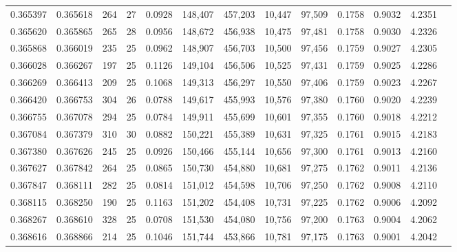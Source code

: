 \begin{tabular}{rrrrrrrrrrrrr}
0.365397 & 0.365618 & 264 &  27 &                                     0.0928 & 148,407 & 457,203 &  10,447 &  97,509 & 0.1758 & 0.9032 & 4.2351 \\
0.365620 & 0.365865 & 265 &  28 &                                     0.0956 & 148,672 & 456,938 &  10,475 &  97,481 & 0.1758 & 0.9030 & 4.2326 \\
0.365868 & 0.366019 & 235 &  25 &                                     0.0962 & 148,907 & 456,703 &  10,500 &  97,456 & 0.1759 & 0.9027 & 4.2305 \\
0.366028 & 0.366267 & 197 &  25 &                                     0.1126 & 149,104 & 456,506 &  10,525 &  97,431 & 0.1759 & 0.9025 & 4.2286 \\
0.366269 & 0.366413 & 209 &  25 &                                     0.1068 & 149,313 & 456,297 &  10,550 &  97,406 & 0.1759 & 0.9023 & 4.2267 \\
0.366420 & 0.366753 & 304 &  26 &                                     0.0788 & 149,617 & 455,993 &  10,576 &  97,380 & 0.1760 & 0.9020 & 4.2239 \\
0.366755 & 0.367078 & 294 &  25 &                                     0.0784 & 149,911 & 455,699 &  10,601 &  97,355 & 0.1760 & 0.9018 & 4.2212 \\
0.367084 & 0.367379 & 310 &  30 &                                     0.0882 & 150,221 & 455,389 &  10,631 &  97,325 & 0.1761 & 0.9015 & 4.2183 \\
0.367380 & 0.367626 & 245 &  25 &                                     0.0926 & 150,466 & 455,144 &  10,656 &  97,300 & 0.1761 & 0.9013 & 4.2160 \\
0.367627 & 0.367842 & 264 &  25 &                                     0.0865 & 150,730 & 454,880 &  10,681 &  97,275 & 0.1762 & 0.9011 & 4.2136 \\
0.367847 & 0.368111 & 282 &  25 &                                     0.0814 & 151,012 & 454,598 &  10,706 &  97,250 & 0.1762 & 0.9008 & 4.2110 \\
0.368115 & 0.368250 & 190 &  25 &                                     0.1163 & 151,202 & 454,408 &  10,731 &  97,225 & 0.1762 & 0.9006 & 4.2092 \\
0.368267 & 0.368610 & 328 &  25 &                                     0.0708 & 151,530 & 454,080 &  10,756 &  97,200 & 0.1763 & 0.9004 & 4.2062 \\
0.368616 & 0.368866 & 214 &  25 &                                     0.1046 & 151,744 & 453,866 &  10,781 &  97,175 & 0.1763 & 0.9001 & 4.2042 \\

\end{tabular}

